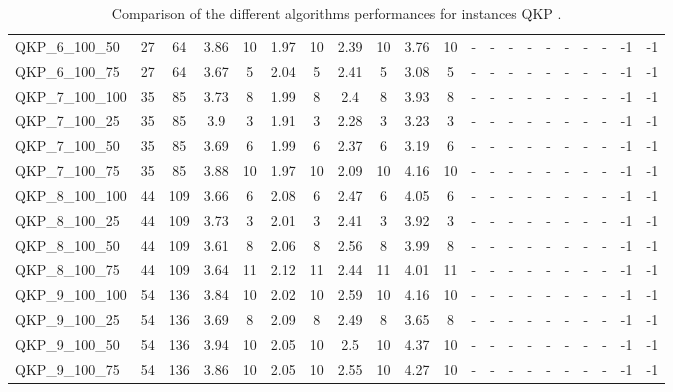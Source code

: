 \begin{sidewaystable}[!ht]
{\begin{tabular}{lcccccccccccccccccccc}
QKP\_6\_100\_50 & 27 & 64 & 3.86 & 10 &  \textcolor{blue2}{1.97} & 10 & 2.39 & 10 & 3.76 & 10 &  - &  - &  - &  - &  - &  - &  - &  - & -1 & -1 \\
QKP\_6\_100\_75 & 27 & 64 & 3.67 & 5 &  \textcolor{blue2}{2.04} & 5 & 2.41 & 5 & 3.08 & 5 &  - &  - &  - &  - &  - &  - &  - &  - & -1 & -1 \\
QKP\_7\_100\_100 & 35 & 85 & 3.73 & 8 &  \textcolor{blue2}{1.99} & 8 & 2.4 & 8 & 3.93 & 8 &  - &  - &  - &  - &  - &  - &  - &  - & -1 & -1 \\
QKP\_7\_100\_25 & 35 & 85 & 3.9 & 3 &  \textcolor{blue2}{1.91} & 3 & 2.28 & 3 & 3.23 & 3 &  - &  - &  - &  - &  - &  - &  - &  - & -1 & -1 \\
QKP\_7\_100\_50 & 35 & 85 & 3.69 & 6 &  \textcolor{blue2}{1.99} & 6 & 2.37 & 6 & 3.19 & 6 &  - &  - &  - &  - &  - &  - &  - &  - & -1 & -1 \\
QKP\_7\_100\_75 & 35 & 85 & 3.88 & 10 &  \textcolor{blue2}{1.97} & 10 & 2.09 & 10 & 4.16 & 10 &  - &  - &  - &  - &  - &  - &  - &  - & -1 & -1 \\
QKP\_8\_100\_100 & 44 & 109 & 3.66 & 6 &  \textcolor{blue2}{2.08} & 6 & 2.47 & 6 & 4.05 & 6 &  - &  - &  - &  - &  - &  - &  - &  - & -1 & -1 \\
QKP\_8\_100\_25 & 44 & 109 & 3.73 & 3 &  \textcolor{blue2}{2.01} & 3 & 2.41 & 3 & 3.92 & 3 &  - &  - &  - &  - &  - &  - &  - &  - & -1 & -1 \\
QKP\_8\_100\_50 & 44 & 109 & 3.61 & 8 &  \textcolor{blue2}{2.06} & 8 & 2.56 & 8 & 3.99 & 8 &  - &  - &  - &  - &  - &  - &  - &  - & -1 & -1 \\
QKP\_8\_100\_75 & 44 & 109 & 3.64 & 11 &  \textcolor{blue2}{2.12} & 11 & 2.44 & 11 & 4.01 & 11 &  - &  - &  - &  - &  - &  - &  - &  - & -1 & -1 \\
QKP\_9\_100\_100 & 54 & 136 & 3.84 & 10 &  \textcolor{blue2}{2.02} & 10 & 2.59 & 10 & 4.16 & 10 &  - &  - &  - &  - &  - &  - &  - &  - & -1 & -1 \\
QKP\_9\_100\_25 & 54 & 136 & 3.69 & 8 &  \textcolor{blue2}{2.09} & 8 & 2.49 & 8 & 3.65 & 8 &  - &  - &  - &  - &  - &  - &  - &  - & -1 & -1 \\
QKP\_9\_100\_50 & 54 & 136 & 3.94 & 10 &  \textcolor{blue2}{2.05} & 10 & 2.5 & 10 & 4.37 & 10 &  - &  - &  - &  - &  - &  - &  - &  - & -1 & -1 \\
QKP\_9\_100\_75 & 54 & 136 & 3.86 & 10 &  \textcolor{blue2}{2.05} & 10 & 2.55 & 10 & 4.27 & 10 &  - &  - &  - &  - &  - &  - &  - &  - & -1 & -1 \\
\bottomrule
\end{tabular}
}%
\caption{Comparison of the different algorithms performances for instances QKP .}
\label{tab:table_compare_QKP }
\end{sidewaystable}

